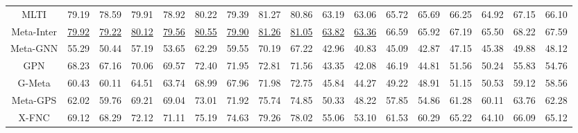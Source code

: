 \begin{table*}[ht]
{\begin{tabular}{@{}c|cccccccc|cccccccc@{}}
MLTI                   & 79.19          & 78.59          & 79.91          & 78.92           & 80.22          & 79.39          & 81.27          & 80.86          & 63.19          & 63.06          & 65.72          & 65.69          & 66.25          & 64.92          & 67.15          & 66.10          \\
Meta-Inter                   & \underline{79.92}          & \underline{79.22}          & \underline{80.12}          & \underline{79.56}           & \underline{80.55}          & \underline{79.90}          & \underline{81.26}          & \underline{81.05}          & \underline{63.82}          & \underline{63.36}          & 66.59          & 65.92          & 67.19          & 65.50          & 68.22          & 67.59          \\ \midrule
Meta-GNN               & 55.29          & 50.44          & 57.19          & 53.65          & 62.29          & 59.55          & 70.19          & 67.22          & 42.96          & 40.83          & 45.09          & 42.87          & 47.15          & 45.38          & 49.88          & 48.12          \\
GPN                    & 68.23          & 67.16          & 70.06          & 69.57          & 72.40          & 71.95          & 72.81          & 71.56          & 43.35          & 42.08          & 46.19          & 44.81          & 51.56          & 50.24          & 55.83          & 54.76          \\
G-Meta                 & 60.43          & 60.11          & 64.51          & 63.74          & 68.99          & 67.96          & 71.98          & 72.75          & 45.84          & 44.27          & 49.22          & 48.91          & 51.15          & 50.53          & 59.12          & 58.56          \\
Meta-GPS               & 62.02          & 59.76          & 69.21          & 69.04          & 73.01          & 71.92          & 75.74          & 74.85          & 50.33          & 48.22          & 57.85          & 54.86          & 61.28          & 60.11          & 63.76          & 62.28          \\
X-FNC                   & 69.12    & 68.29    & 72.12    & 71.11    & 75.19    & 74.63    & 79.26    & 78.02    & 55.06          & 53.10          & 61.53          & 60.29          & 65.22    & 64.10    & 66.09    & 65.12    \\ 

\end{tabular}}
\end{table*}
